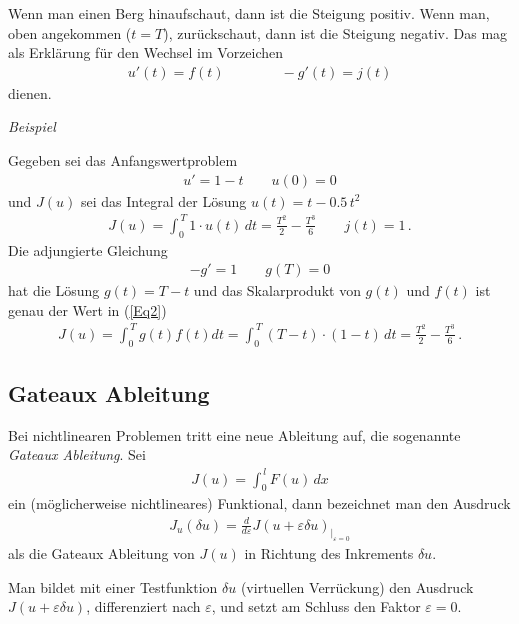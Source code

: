 Wenn man einen Berg hinaufschaut, dann ist die Steigung positiv. Wenn man, oben angekommen ($t = T$), zur\"{u}ckschaut, dann ist die Steigung negativ. Das mag als Erkl\"{a}rung f\"{u}r den Wechsel im Vorzeichen
\begin{align}
 u'(t) = f(t) \qquad \qquad -g'(t) = j(t)
\end{align}
dienen.\\
\begin{flushleft}{\em Beispiel\/} \end{flushleft} Gegeben sei das Anfangs\-wert\-problem
\begin{align}
u' = 1- t \qquad u(0) = 0
\end{align}
und $J(u)$ sei das Integral der L\"{o}sung $u(t) = t - 0.5\,t^2$
\begin{align} \label{Eq2}
J(u) = \int_0^{\,T} 1 \cdot u(t)\,dt =  \frac{T^2}{2} - \frac{T^3}{6} \qquad j(t) = 1\,.
\end{align}
Die adjungierte Gleichung
\begin{align}
- g' = 1 \qquad g(T) = 0
\end{align}
hat die L\"{o}sung $g(t) = T - t$ und das Skalarprodukt von $g(t)$ und $f(t) $ ist genau der Wert in (\ref{Eq2})
\begin{align}
J(u) = \int_0^{\,T} g(t) f(t) dt = \int_0^{\,T}(T - t) \cdot  (1 - t) \,dt = \frac{T^2}{2} - \frac{T^3}{6}\,.
\end{align}


\textcolor{sectionTitleBlue}{\section{Gateaux Ableitung}}
Bei nichtlinearen Problemen tritt eine neue Ableitung auf, die sogenannte {\em Gateaux Ableitung\/}. Sei
\begin{align}
J(u) = \int_0^{\,l} F(u)\,dx
\end{align}
ein (m\"{o}glicherweise nichtlineares) Funktional, dann bezeichnet man den Ausdruck
\begin{align}
J_{u}(\delta u) = \frac{d}{d\varepsilon} J(u + \varepsilon \delta u) _{|_{\varepsilon = 0}}
\end{align}
als die Gateaux Ableitung von $J(u)$ in Richtung des Inkrements $\delta u$.

Man bildet mit einer Testfunktion $\delta u$ (virtuellen Verr\"{u}ckung) den Ausdruck $J(u + \varepsilon \delta u)$, differenziert nach $\varepsilon$, und setzt am Schluss den Faktor $\varepsilon = 0$.

